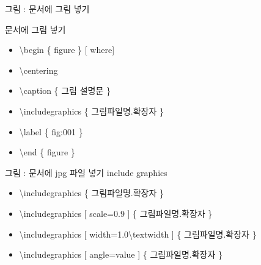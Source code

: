 \documentclass[ aspectratio=149,  14pt,blue,xcolor=pdftex,dvipsnames,table,handout,notes]{beamer}
\begin{document}

		\begin{frame}[plain]
		\centering
		\scalebox{10}{그림}

		
		\end{frame}


		\begin{frame}[t]{그림 : 문서에 그림 넣기}

			\begin{block} {문서에 그림 넣기}
			\begin{itemize}
			\item[]	\textbackslash begin \{ figure \} [ where] 
			\item[]	\textbackslash centering
			\item[]	\textbackslash  caption \{ 그림 설명문 \}
			\item[]	\textbackslash  includegraphics \{ 그림파일명.확장자 \}
			\item[]	\textbackslash  label \{ fig:001 \}
			\item[]	\textbackslash end \{ figure \}
			\end{itemize}
			\end{block}


			\begin{block} {그림 : 문서에 jpg 파일 넣기  include graphics}
			\begin{itemize}
			\item[]	\textbackslash  includegraphics \{ 그림파일명.확장자 \}
			\item[]	\textbackslash  includegraphics [ scale=0.9 ] \{ 그림파일명.확장자 \}
			\item[]	\textbackslash  includegraphics [ width=1.0\textbackslash textwidth ] \{ 그림파일명.확장자 \}
			\item[]	\textbackslash  includegraphics [ angle=value ] \{ 그림파일명.확장자 \}
			\end{itemize}
			\end{block}




\end{frame}
\end{document}
